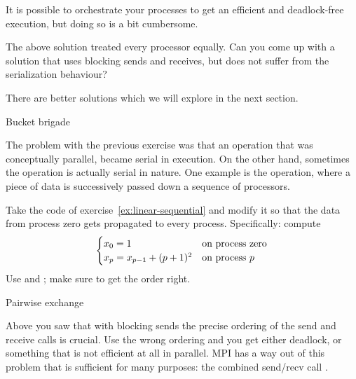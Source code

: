 It is possible to orchestrate your processes to get an efficient and
deadlock-free execution, but doing so is a bit cumbersome.

\begin{exercise}
  The above solution treated every processor equally. Can you come up
  with a solution that uses blocking sends and receives, but does not
  suffer from the serialization behaviour?
\end{exercise}

There are better solutions which we will
explore in the next section.

 {Bucket brigade}
\label{sec:bucketbrigade}

The problem with the previous exercise was that an operation that was
conceptually parallel, became serial in execution. On the other hand,
sometimes the operation is actually serial in nature. One example is
the  operation, where a piece of data is
successively passed down a sequence of processors.

\begin{exercise}
  \label{ex:bucket-block}
  Take the code of exercise~\ref{ex:linear-sequential} and modify it
  so that the data from process zero gets propagated to every
  process. Specifically: compute
  \[ 
  \begin{cases}
    x_0 = 1&\hbox{on process zero}\\
    x_p = x_{p-1}+(p+1)^2 & \hbox{on process $p$}\\
  \end{cases}
  \]
  Use  and ; make sure to get the order right.
\end{exercise}


 {Pairwise exchange}
\label{sec:send-recv}

Above you saw that with blocking sends the precise ordering of the
send and receive calls is crucial. Use the wrong ordering and you get
either deadlock, or something that is not efficient at all in
parallel. MPI has a way out of this problem that is sufficient for
many purposes: the combined send/recv call .

